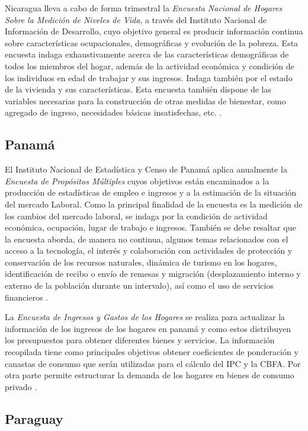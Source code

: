\documentclass[
  12pt,
]{book}
\begin{document}
Nicaragua lleva a cabo de forma trimestral la \emph{Encuesta Nacional de Hogares Sobre la Medición de Niveles de Vida}, a través del Instituto Nacional de Información de Desarrollo, cuyo objetivo general es producir información continua sobre características ocupacionales, demográficas y evolución de la pobreza. Esta encuesta indaga exhaustivamente acerca de las características demográficas de todos los miembros del hogar, además de la actividad económica y condición de los individuos en edad de trabajar y sus ingresos. Indaga también por el estado de la vivienda y sus características. Esta encuesta también dispone de las variables necesarias para la construcción de otras medidas de bienestar, como agregado de ingreso, necesidades básicas insatisfechas, etc. \citep{INIDE-NI}.

\hypertarget{panamuxe1}{%
\subsection{Panamá}\label{panamuxe1}}

El Instituto Nacional de Estadística y Censo de Panamá aplica anualmente la \emph{Encuesta de Propósitos Múltiples} cuyos objetivos están encaminados a la producción de estadísticas de empleo e ingresos y a la estimación de la situación del mercado Laboral. Como la principal finalidad de la encuesta es la medición de los cambios del mercado laboral, se indaga por la condición de actividad económica, ocupación, lugar de trabajo e ingresos. También se debe resaltar que la encuesta aborda, de manera no continua, algunos temas relacionados con el acceso a la tecnología, el interés y colaboración con actividades de protección y conservación de los recursos naturales, dinámica de turismo en los hogares, identificación de recibo o envío de remesas y migración (desplazamiento interno y externo de la población durante un intervalo), así como el uso de servicios financieros \citep{INEC-PA}.

La \emph{Encuesta de Ingresos y Gastos de los Hogares} se realiza para actualizar la información de los ingresos de los hogares en panamá y como estos distribuyen los presupuestos para obtener diferentes bienes y servicios. La información recopilada tiene como principales objetivos obtener coeficientes de ponderación y canastas de consumo que serán utilizadas para el cálculo del IPC y la CBFA. Por otra parte permite estructurar la demanda de los hogares en bienes de consumo privado \citep{INEC2-PA}.

\hypertarget{paraguay}{%
\subsection{Paraguay}\label{paraguay}}
\end{document}

